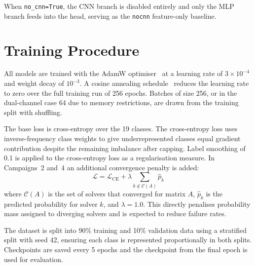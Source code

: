 When \texttt{no\_cnn=True}, the CNN branch is disabled entirely and only the MLP branch
feeds into the head, serving as the \texttt{nocnn} feature-only baseline.

\section{Training Procedure}\label{sec:training}

All models are trained with the AdamW optimiser~\cite{loshchilov2019decoupled}
at a learning rate of $3 \times 10^{-4}$ and weight decay of $10^{-3}$.
A cosine annealing schedule~\cite{loshchilov2017sgdr} reduces the learning rate to zero over the full
training run of 256 epochs.
Batches of size 256, or in the dual-channel case 64 due to memory restrictions, are drawn
from the training split with shuffling.

The base loss is cross-entropy over the 19 classes.
The cross-entropy loss uses inverse-frequency class weights to give underrepresented classes equal gradient contribution despite the remaining imbalance after capping.
Label smoothing of 0.1 is applied to the cross-entropy loss as a regularisation measure.
In Campaigns~2 and~4 an additional convergence penalty is added:
\[
  \mathcal{L} = \mathcal{L}_{\text{CE}} + \lambda \sum_{k \notin \mathcal{C}(A)} \hat{p}_k
\]
where $\mathcal{C}(A)$ is the set of solvers that converged for matrix $A$,
$\hat{p}_k$ is the predicted probability for solver $k$, and $\lambda = 1.0$.
This directly penalises probability mass assigned to diverging solvers and is expected to reduce failure rates.

The dataset is split into 90\% training and 10\% validation data using a stratified split
with seed 42, ensuring each class is represented proportionally in both splits.
Checkpoints are saved every 5 epochs and the checkpoint from the final epoch is used for evaluation.